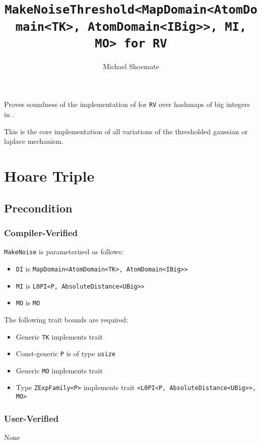 \documentclass{article}
\title{\texttt{MakeNoiseThreshold<MapDomain<AtomDomain<TK>, AtomDomain<IBig>{}>, MI, MO> for RV}}
\author{Michael Shoemate}
\date{}
\begin{document}
\maketitle

\contrib
Proves soundness of the implementation of  
for \texttt{RV} over hashmaps of big integers in .

This is the core implementation of all variations of the thresholded gaussian or laplace mechanism.

\section{Hoare Triple}
\subsection*{Precondition}
\subsubsection*{Compiler-Verified}
\texttt{MakeNoise} is parameterized as follows:
\begin{itemize}
    \item \texttt{DI} is \texttt{MapDomain<AtomDomain<TK>, AtomDomain<IBig>{}>}
    \item \texttt{MI} is \texttt{L0PI<P, AbsoluteDistance<UBig>{}>}
    \item \texttt{MO} is \texttt{MO}
\end{itemize}

The following trait bounds are required:
\begin{itemize}
    \item Generic \texttt{TK} implements trait 
    \item Const-generic \texttt{P} is of type \texttt{usize}
    \item Generic \texttt{MO} implements trait 
    \item Type \texttt{ZExpFamily<P>} implements trait \texttt{<L0PI<P, AbsoluteDistance<UBig>{}>, MO>}
\end{itemize}

\subsubsection*{User-Verified}
None
\end{document}
